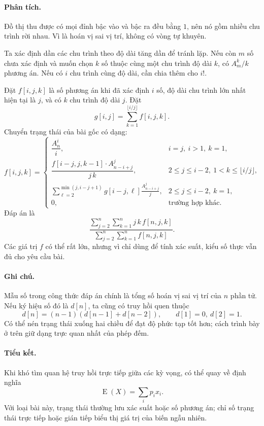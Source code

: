\documentclass[11pt]{article}
\newcommand{\E}{\operatorname{E}}
\begin{document}
\paragraph{Phân tích.}
Đồ thị thu được có mọi đỉnh bậc vào và bậc ra đều bằng \(1\), nên nó gồm nhiều
chu trình rời nhau. Vì là hoán vị sai vị trí, không có vòng tự khuyên.

Ta xác định dần các chu trình theo độ dài tăng dần để tránh lặp. Nếu còn
\(m\) số chưa xác định và muốn chọn \(k\) số thuộc cùng một chu trình độ dài
\(k\), có \(A_m^k/k\) phương án. Nếu có \(i\) chu trình cùng độ dài, cần chia
thêm cho \(i!\).

Đặt \(f[i,j,k]\) là số phương án khi đã xác định \(i\) số, độ dài chu trình
lớn nhất hiện tại là \(j\), và có \(k\) chu trình độ dài \(j\). Đặt
\[
  g[i,j]=\sum_{k=1}^{\lfloor i/j\rfloor} f[i,j,k].
\]
Chuyển trạng thái của bài gốc có dạng:
\[
f[i,j,k]=
\begin{cases}
\dfrac{A_n^i}{i}, & i=j,\ i>1,\ k=1,\\[0.8em]
\dfrac{f[i-j,j,k-1]\cdot A_{n-i+j}^{j}}{j\,k},
  & 2\le j\le i-2,\ 1<k\le\lfloor i/j\rfloor,\\[0.8em]
\displaystyle\sum_{\ell=2}^{\min(j,i-j+1)}
  g[i-j,\ell]\frac{A_{n-i+j}^{j}}{j},
  & 2\le j\le i-2,\ k=1,\\[0.8em]
0, & \text{trường hợp khác.}
\end{cases}
\]
Đáp án là
\[
  \frac{\sum_{j=2}^{n}\sum_{k=1}^{n} j\,k\,f[n,j,k]}
       {\sum_{j=2}^{n}\sum_{k=1}^{n} f[n,j,k]}.
\]
Các giá trị \(f\) có thể rất lớn, nhưng vì chỉ dùng để tính xác suất, kiểu số
thực vẫn đủ cho yêu cầu bài.

\paragraph{Ghi chú.}
Mẫu số trong công thức đáp án chính là tổng số hoán vị sai vị trí của \(n\)
phần tử. Nếu ký hiệu số đó là \(d[n]\), ta cũng có truy hồi quen thuộc
\[
  d[n]=(n-1)(d[n-1]+d[n-2]),\qquad d[1]=0,\ d[2]=1.
\]
Có thể nén trạng thái xuống hai chiều để đạt độ phức tạp tốt hơn; cách trình
bày ở trên giữ dạng trực quan nhất của phép đếm.

\paragraph{Tiểu kết.}
Khi khó tìm quan hệ truy hồi trực tiếp giữa các kỳ vọng, có thể quay về định
nghĩa
\[
  \E(X)=\sum_i p_i x_i.
\]
Với loại bài này, trạng thái thường lưu xác suất hoặc số phương án; chỉ số
trạng thái trực tiếp hoặc gián tiếp biểu thị giá trị của biến ngẫu nhiên.
\end{document}
